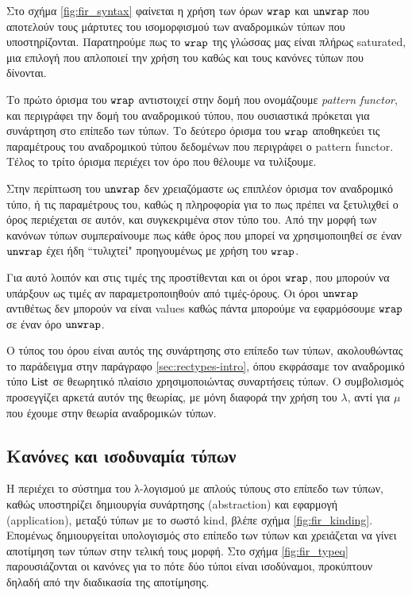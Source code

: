 Στο σχήμα \ref{fig:fir_syntax} φαίνεται η χρήση των όρων $\operatorname{\texttt{wrap}}$ και $\operatorname{\texttt{unwrap}}$ που αποτελούν
τους μάρτυτες του ισομορφισμού των αναδρομικών τύπων που υποστηρίζονται. Παρατηρούμε
πως το $\operatorname{\texttt{wrap}}$ της γλώσσας μας είναι πλήρως saturated, μια επιλογή που απλοποιεί την χρήση
του καθώς και τους κανόνες τύπων που δίνονται.

Το πρώτο όρισμα του $\operatorname{\texttt{wrap}}$ αντιστοιχεί στην δομή που ονομάζουμε \emph{pattern functor}, και περιγράφει
την δομή του αναδρομικού τύπου, που ουσιαστικά πρόκεται για συνάρτηση στο επίπεδο των τύπων.
Το δεύτερο όρισμα του $\operatorname{\texttt{wrap}}$ αποθηκεύει τις παραμέτρους του αναδρομικού τύπου δεδομένων
που περιγράφει ο pattern functor. Τέλος το τρίτο όρισμα περιέχει τον όρο που θέλουμε να τυλίξουμε.

Στην περίπτωση του $\operatorname{\texttt{unwrap}}$ δεν χρειαζόμαστε ως επιπλέον όρισμα τον αναδρομικό τύπο, ή τις παραμέτρους του, καθώς η πληροφορία για το πως πρέπει να ξετυλιχθεί ο όρος περιέχεται σε αυτόν,
και συγκεκριμένα στον τύπο του. Από την μορφή των κανόνων τύπων συμπεραίνουμε πως κάθε όρος
που μπορεί να χρησιμοποιηθεί σε έναν $\operatorname{\texttt{unwrap}}$ έχει ήδη ``τυλιχτεί" προηγουμένως με χρήση του
$\operatorname{\texttt{wrap}}$.

Για αυτό λοιπόν και στις τιμές της \FOMF{} προστίθενται και οι όροι $\operatorname{\texttt{wrap}}$, που μπορούν να υπάρξουν
ως τιμές αν παραμετροποιηθούν από τιμές-όρους. Οι όροι $\operatorname{\texttt{unwrap}}$ αντιθέτως δεν μπορούν να είναι values
καθώς πάντα μπορούμε να εφαρμόσουμε $\operatorname{\texttt{wrap}}$ σε έναν όρο $\operatorname{\texttt{unwrap}}$.

Ο τύπος του όρου είναι αυτός της συνάρτησης στο επίπεδο των τύπων, ακολουθώντας το παράδειγμα
στην παράγραφο \ref{sec:rectypes-intro}, όπου εκφράσαμε τον αναδρομικό τύπο $\operatorname{\textsf{List}}$ σε θεωρητικό
πλαίσιο χρησιμοποιώντας συναρτήσεις τύπων. Ο συμβολισμός προσεγγίζει αρκετά αυτόν της θεωρίας,
με μόνη διαφορά την χρήση του $\lambda$, αντί για $\mu$ που έχουμε στην θεωρία αναδρομικών τύπων.




\subsection{Κανόνες και ισοδυναμία τύπων}

H \FOMF{} περιέχει το σύστημα του λ-λογισμού με απλούς τύπους στο επίπεδο των τύπων, καθώς υποστηρίζει
δημιουργία συνάρτησης (abstraction) και εφαρμογή (application), μεταξύ τύπων με το σωστό kind, βλέπε
σχήμα \ref{fig:fir_kinding}. Επομένως δημιουργείται υπολογισμός στο επίπεδο των τύπων και χρειάζεται
να γίνει αποτίμηση των τύπων στην τελική τους μορφή. Στο σχήμα \ref{fig:fir_typeq} παρουσιάζονται οι
κανόνες για το πότε δύο τύποι είναι ισοδύναμοι, προκύπτουν δηλαδή από την διαδικασία της αποτίμησης.

